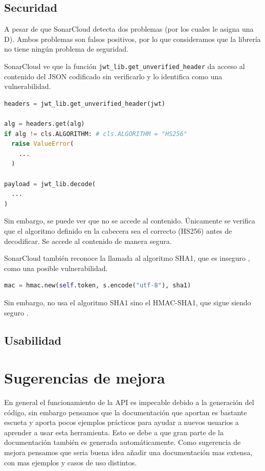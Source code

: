 \documentclass{article}
\begin{document}
\subsection{Securidad}

A pesar de que SonarCloud detecta dos problemas
(por los cuales le asigna una D).
Ambos problemas son falsos positivos, 
por lo que consideramos que la librería no tiene ningún problema de seguridad.

\hfill

SonarCloud ve que la función \verb|jwt_lib.get_unverified_header|
da acceso al contenido del JSON codificado sin verificarlo
y lo identifica como una vulnerabilidad.

\begin{lstlisting}[language=Python]
headers = jwt_lib.get_unverified_header(jwt)

alg = headers.get(alg)
if alg != cls.ALGORITHM: # cls.ALGORITHM = "HS256"
  raise ValueError(
    ...
  )

payload = jwt_lib.decode(
  ...
)
\end{lstlisting}

Sin embargo, se puede ver que no se accede al contenido.
Únicamente se verifica que el algoritmo definido en la cabecera
sea el correcto (HS256) antes de decodificar.
Se accede al contenido de manera segura.

\hfill

SonarCloud también reconoce la llamada al algoritmo SHA1,
que es inseguro \cite{sha1-broken},
como una posible vulnerabilidad.

\begin{lstlisting}[language=Python]
mac = hmac.new(self.token, s.encode("utf-8"), sha1)
\end{lstlisting}

Sin embargo, no usa el algoritmo SHA1
sino el HMAC-SHA1, que sigue siendo seguro \cite{hmac-sha1}.

\subsection{Usabilidad}

\section{Sugerencias de mejora}
En general el funcionamiento de la API es impecable debido a la generación del código, sin embargo pensamos que la documentación que aportan es bastante escueta y aporta pocos ejemplos prácticos para ayudar a nuevos usuarios a aprender a usar esta herramienta. Esto se debe a que gran parte de la documentación también es generada automáticamente.
Como sugerencia de mejora pensamos que seria buena idea añadir una documentación mas extensa, con mas ejemplos y casos de uso distintos.
\end{document}

